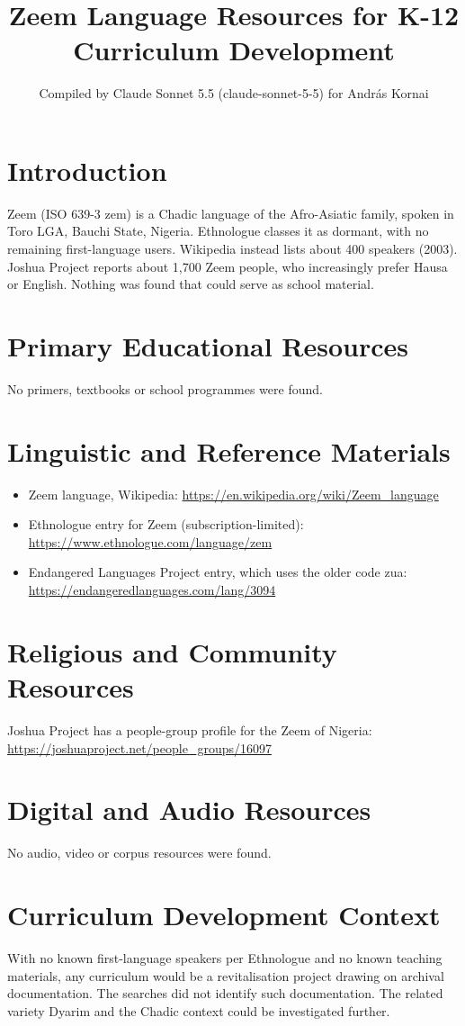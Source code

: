 \documentclass[12pt]{article}
\title{Zeem Language Resources for K-12 Curriculum Development}
\author{Compiled by Claude Sonnet 5.5 (claude-sonnet-5-5) for Andr\'as Kornai}
\date{}
\begin{document}
\maketitle

\section{Introduction}
Zeem (ISO 639-3 zem) is a Chadic language of the Afro-Asiatic family, spoken in Toro LGA, Bauchi State, Nigeria. Ethnologue classes it as dormant, with no remaining first-language users. Wikipedia instead lists about 400 speakers (2003). Joshua Project reports about 1,700 Zeem people, who increasingly prefer Hausa or English. Nothing was found that could serve as school material.

\section{Primary Educational Resources}
No primers, textbooks or school programmes were found.

\section{Linguistic and Reference Materials}
\begin{itemize}
\item Zeem language, Wikipedia: \url{https://en.wikipedia.org/wiki/Zeem_language}
\item Ethnologue entry for Zeem (subscription-limited): \url{https://www.ethnologue.com/language/zem}
\item Endangered Languages Project entry, which uses the older code zua: \url{https://endangeredlanguages.com/lang/3094}
\end{itemize}

\section{Religious and Community Resources}
Joshua Project has a people-group profile for the Zeem of Nigeria: \url{https://joshuaproject.net/people_groups/16097}

\section{Digital and Audio Resources}
No audio, video or corpus resources were found.

\section{Curriculum Development Context}
With no known first-language speakers per Ethnologue and no known teaching materials, any curriculum would be a revitalisation project drawing on archival documentation. The searches did not identify such documentation. The related variety Dyarim and the Chadic context could be investigated further.
\end{document}
